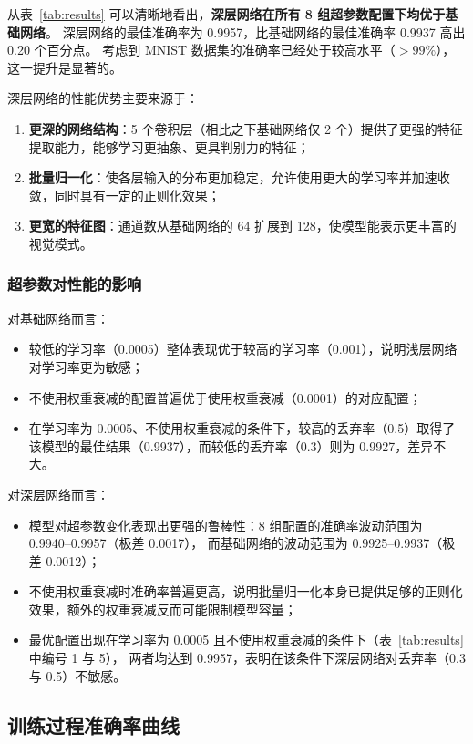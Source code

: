 \documentclass[UTF8,a4paper,12pt]{ctexart}
\begin{document}
从表~\ref{tab:results} 可以清晰地看出，\textbf{深层网络在所有 8 组超参数配置下均优于基础网络}。
深层网络的最佳准确率为 0.9957，比基础网络的最佳准确率 0.9937 高出 0.20 个百分点。
考虑到 MNIST 数据集的准确率已经处于较高水平（$>99\%$），这一提升是显著的。

深层网络的性能优势主要来源于：
\begin{enumerate}
    \item \textbf{更深的网络结构}：5 个卷积层（相比之下基础网络仅 2 个）提供了更强的特征提取能力，能够学习更抽象、更具判别力的特征；
    \item \textbf{批量归一化}：使各层输入的分布更加稳定，允许使用更大的学习率并加速收敛，同时具有一定的正则化效果；
    \item \textbf{更宽的特征图}：通道数从基础网络的 64 扩展到 128，使模型能表示更丰富的视觉模式。
\end{enumerate}

\subsubsection{超参数对性能的影响}

对基础网络而言：
\begin{itemize}
    \item 较低的学习率（0.0005）整体表现优于较高的学习率（0.001），说明浅层网络对学习率更为敏感；
    \item 不使用权重衰减的配置普遍优于使用权重衰减（0.0001）的对应配置；
    \item 在学习率为 0.0005、不使用权重衰减的条件下，较高的丢弃率（0.5）取得了该模型的最佳结果（0.9937），而较低的丢弃率（0.3）则为 0.9927，差异不大。
\end{itemize}

对深层网络而言：
\begin{itemize}
    \item 模型对超参数变化表现出更强的鲁棒性：8 组配置的准确率波动范围为 0.9940--0.9957（极差 0.0017），
          而基础网络的波动范围为 0.9925--0.9937（极差 0.0012）；
    \item 不使用权重衰减时准确率普遍更高，说明批量归一化本身已提供足够的正则化效果，额外的权重衰减反而可能限制模型容量；
    \item 最优配置出现在学习率为 0.0005 且不使用权重衰减的条件下（表~\ref{tab:results} 中编号 1 与 5），
          两者均达到 0.9957，表明在该条件下深层网络对丢弃率（0.3 与 0.5）不敏感。
\end{itemize}

\subsection{训练过程准确率曲线}
\end{document}
